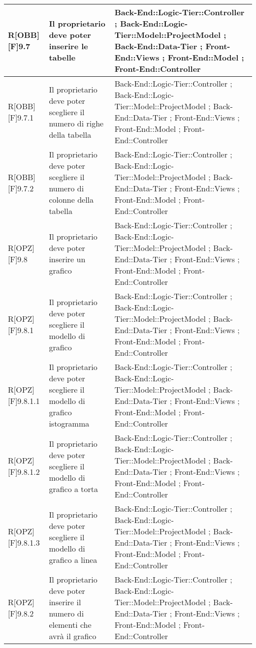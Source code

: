 \begin{table}[h]
\begin{tabular}{|p{}|p{}|p{}|}
			R[OBB][F]9.7 & Il proprietario deve poter inserire le tabelle & Back-End::Logic-Tier::Controller ; Back-End::Logic-Tier::Model::ProjectModel ; Back-End::Data-Tier ; Front-End::Views ; Front-End::Model ; Front-End::Controller \\ \midrule
			R[OBB][F]9.7.1 & Il proprietario deve poter scegliere il numero di righe della tabella & Back-End::Logic-Tier::Controller ; Back-End::Logic-Tier::Model::ProjectModel ; Back-End::Data-Tier ; Front-End::Views ; Front-End::Model ; Front-End::Controller \\ \midrule
			R[OBB][F]9.7.2 & Il proprietario deve poter scegliere il numero di colonne della tabella & Back-End::Logic-Tier::Controller ; Back-End::Logic-Tier::Model::ProjectModel ; Back-End::Data-Tier ; Front-End::Views ; Front-End::Model ; Front-End::Controller \\ \midrule
			R[OPZ][F]9.8 & Il proprietario deve poter inserire un grafico & Back-End::Logic-Tier::Controller ; Back-End::Logic-Tier::Model::ProjectModel ; Back-End::Data-Tier ; Front-End::Views ; Front-End::Model ; Front-End::Controller \\ \midrule
			R[OPZ][F]9.8.1 & Il proprietario deve poter scegliere il modello di grafico & Back-End::Logic-Tier::Controller ; Back-End::Logic-Tier::Model::ProjectModel ; Back-End::Data-Tier ; Front-End::Views ; Front-End::Model ; Front-End::Controller \\ \midrule
			R[OPZ][F]9.8.1.1 & Il proprietario deve poter scegliere il modello di grafico istogramma & Back-End::Logic-Tier::Controller ; Back-End::Logic-Tier::Model::ProjectModel ; Back-End::Data-Tier ; Front-End::Views ; Front-End::Model ; Front-End::Controller \\ \midrule
			R[OPZ][F]9.8.1.2 & Il proprietario deve poter scegliere il modello di grafico a torta & Back-End::Logic-Tier::Controller ; Back-End::Logic-Tier::Model::ProjectModel ; Back-End::Data-Tier ; Front-End::Views ; Front-End::Model ; Front-End::Controller \\ \midrule
			R[OPZ][F]9.8.1.3 & Il proprietario deve poter scegliere il modello di grafico a linea & Back-End::Logic-Tier::Controller ; Back-End::Logic-Tier::Model::ProjectModel ; Back-End::Data-Tier ; Front-End::Views ; Front-End::Model ; Front-End::Controller \\ \midrule
			R[OPZ][F]9.8.2 & Il proprietario deve poter inserire il numero di elementi che avrà il grafico & Back-End::Logic-Tier::Controller ; Back-End::Logic-Tier::Model::ProjectModel ; Back-End::Data-Tier ; Front-End::Views ; Front-End::Model ; Front-End::Controller \\ \midrule

\end{tabular}
\end{table}
